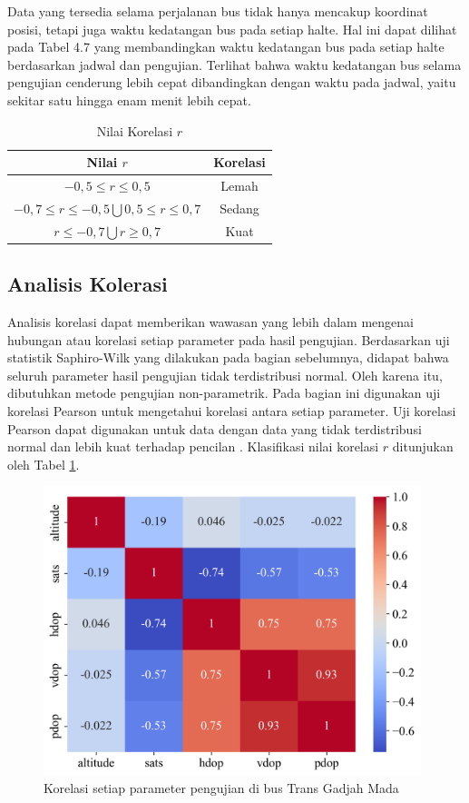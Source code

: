 Data yang tersedia selama perjalanan bus tidak hanya mencakup koordinat posisi, tetapi juga waktu kedatangan bus pada setiap halte. Hal ini dapat dilihat pada Tabel 4.7 yang membandingkan waktu kedatangan bus pada setiap halte berdasarkan jadwal dan pengujian. Terlihat bahwa waktu kedatangan bus selama pengujian cenderung lebih cepat dibandingkan dengan waktu pada jadwal, yaitu sekitar satu hingga enam menit lebih cepat.

\begin{table}[H]
	\caption{Nilai Korelasi $r$ \cite{Carlton2012}}
	\vspace{0.5em}
	\centering
	\begin{tabular}{cc}
		\hline
		\textbf{Nilai $r$} & \textbf{Korelasi}\\
		\hline 
		$-0,5 \leq r \leq 0,5$ & Lemah \\ 
		$ -0,7 \le r \le -0,5 \bigcup 0,5 \le r \le 0,7$ & Sedang \\
		$r \leq -0,7 \bigcup r \geq 0,7$ & Kuat \\
		\hline
	\end{tabular}
	\label{Tab: korelasi-table}
\end{table}

\subsection{Analisis Kolerasi}
Analisis korelasi dapat memberikan wawasan yang lebih dalam mengenai hubungan atau korelasi setiap parameter pada hasil pengujian. Berdasarkan uji statistik Saphiro-Wilk yang dilakukan pada bagian sebelumnya, didapat bahwa seluruh parameter hasil pengujian tidak terdistribusi normal. Oleh karena itu, dibutuhkan metode pengujian non-parametrik. Pada bagian ini digunakan uji korelasi Pearson untuk mengetahui korelasi antara setiap parameter. Uji korelasi Pearson dapat digunakan untuk data dengan data yang tidak terdistribusi normal dan lebih kuat terhadap pencilan \cite{Schober2018}. Klasifikasi nilai korelasi $r$ ditunjukan oleh Tabel \ref{Tab: korelasi-table}.

\begin{figure}[H]
	\centering
	\includegraphics[width=11cm]{contents/chapter-4/pengujian-bergerak/corr.png}
	\caption{Korelasi setiap parameter pengujian di bus Trans Gadjah Mada}
	\label{Fig: moving-corr}
\end{figure}

